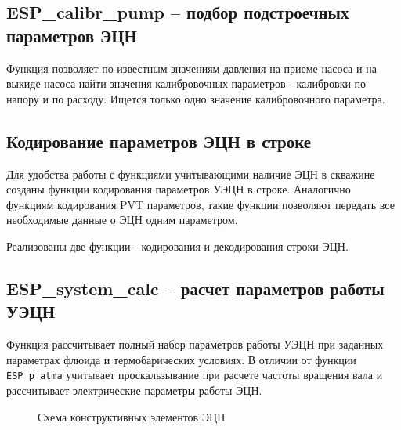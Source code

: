 
\subsection{ESP\_calibr\_pump – подбор подстроечных параметров ЭЦН}

Функция позволяет по известным значениям давления на приеме насоса и на выкиде насоса найти значения калибровочных параметров - калибровки по напору и по расходу. Ищется только одно значение калибровочного параметра.



\subsection{Кодирование параметров ЭЦН в строке}
Для удобства работы с функциями учитывающими наличие ЭЦН в скважине созданы функции кодирования параметров УЭЦН в строке. Аналогично функциям кодирования PVT параметров, такие функции позволяют передать все необходимые данные о ЭЦН одним параметром.

Реализованы две функции - кодирования и декодирования строки ЭЦН.




\subsection{ESP\_system\_calc – расчет параметров работы УЭЦН}
Функция рассчитывает полный набор параметров работы УЭЦН при заданных параметрах флюида и термобарических условиях. В отличии от функции  \texttt{ESP_p_atma} учитывает проскальзывание при расчете частоты вращения вала и рассчитывает электрические параметры работы ЭЦН.

\begin{figure}[H]
	\begin{center}
		
		\caption{Схема конструктивных элементов ЭЦН}
		\label{ris:ESP_well_2_1}
	\end{center}
\end{figure}




